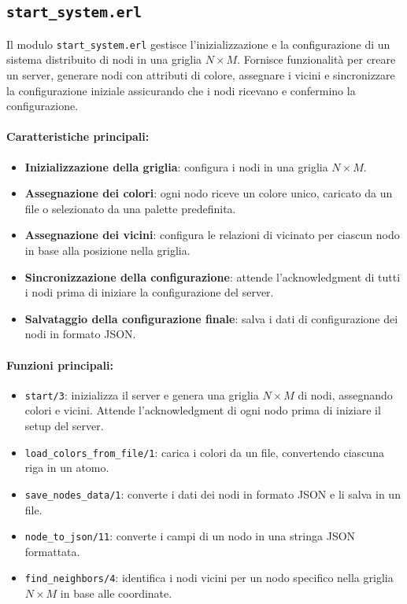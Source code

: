 \documentclass[12pt, a4paper]{report}
\begin{document}
\subsection{\texttt{start\_system.erl}}

Il modulo \texttt{start\_system.erl} gestisce l'inizializzazione e la configurazione di un sistema distribuito di nodi in una griglia $N \times M$. Fornisce funzionalità per creare un server, generare nodi con attributi di colore, assegnare i vicini e sincronizzare la configurazione iniziale assicurando che i nodi ricevano e confermino la configurazione.

\paragraph{Caratteristiche principali:}
\begin{itemize}
    \item \textbf{Inizializzazione della griglia}: configura i nodi in una griglia $N \times M$.
    \item \textbf{Assegnazione dei colori}: ogni nodo riceve un colore unico, caricato da un file o selezionato da una palette predefinita.
    \item \textbf{Assegnazione dei vicini}: configura le relazioni di vicinato per ciascun nodo in base alla posizione nella griglia.
    \item \textbf{Sincronizzazione della configurazione}: attende l'acknowledgment di tutti i nodi prima di iniziare la configurazione del server.
    \item \textbf{Salvataggio della configurazione finale}: salva i dati di configurazione dei nodi in formato JSON.
\end{itemize}

\paragraph{Funzioni principali:}
\begin{itemize}
    \item \texttt{start/3}: inizializza il server e genera una griglia $N \times M$ di nodi, assegnando colori e vicini. Attende l'acknowledgment di ogni nodo prima di iniziare il setup del server.
    \item \texttt{load\_colors\_from\_file/1}: carica i colori da un file, convertendo ciascuna riga in un atomo.
    \item \texttt{save\_nodes\_data/1}: converte i dati dei nodi in formato JSON e li salva in un file.
    \item \texttt{node\_to\_json/11}: converte i campi di un nodo in una stringa JSON formattata.
    \item \texttt{find\_neighbors/4}: identifica i nodi vicini per un nodo specifico nella griglia $N \times M$ in base alle coordinate.
\end{itemize}
\end{document}

